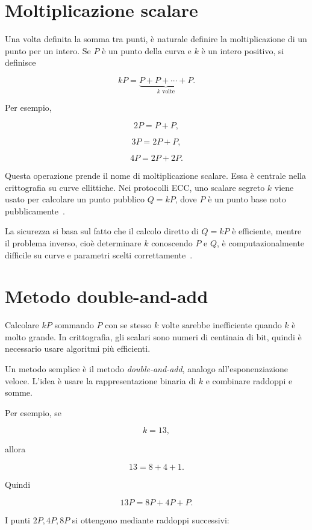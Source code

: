 \documentclass[12pt,a4paper,oneside]{report}
\begin{document}
\section{Moltiplicazione scalare}

Una volta definita la somma tra punti, è naturale definire la moltiplicazione di un punto per un intero. Se \(P\) è un punto della curva e \(k\) è un intero positivo, si definisce

\begin{equation}
    kP = \underbrace{P+P+\cdots+P}_{k \text{ volte}}.
\end{equation}

Per esempio,

\[
2P=P+P,
\]

\[
3P=2P+P,
\]

\[
4P=2P+2P.
\]

Questa operazione prende il nome di moltiplicazione scalare. Essa è centrale nella crittografia su curve ellittiche. Nei protocolli ECC, uno scalare segreto \(k\) viene usato per calcolare un punto pubblico \(Q=kP\), dove \(P\) è un punto base noto pubblicamente~\cite{margara_ec,sec1}.

La sicurezza si basa sul fatto che il calcolo diretto di \(Q=kP\) è efficiente, mentre il problema inverso, cioè determinare \(k\) conoscendo \(P\) e \(Q\), è computazionalmente difficile su curve e parametri scelti correttamente~\cite{margara_ec,sec1}.

\section{Metodo double-and-add}

Calcolare \(kP\) sommando \(P\) con se stesso \(k\) volte sarebbe inefficiente quando \(k\) è molto grande. In crittografia, gli scalari sono numeri di centinaia di bit, quindi è necessario usare algoritmi più efficienti.

Un metodo semplice è il metodo \textit{double-and-add}, analogo all'esponenziazione veloce. L'idea è usare la rappresentazione binaria di \(k\) e combinare raddoppi e somme.

Per esempio, se

\[
k=13,
\]

allora

\[
13 = 8+4+1.
\]

Quindi

\[
13P = 8P+4P+P.
\]

I punti \(2P,4P,8P\) si ottengono mediante raddoppi successivi:
\end{document}
